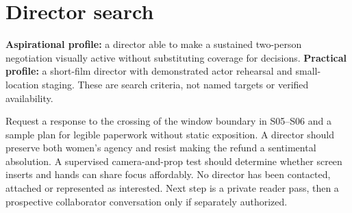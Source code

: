 \section{Director search}
\textbf{Aspirational profile:} a director able to make a sustained two-person negotiation visually active without substituting coverage for decisions. \textbf{Practical profile:} a short-film director with demonstrated actor rehearsal and small-location staging. These are search criteria, not named targets or verified availability.

Request a response to the crossing of the window boundary in S05–S06 and a sample plan for legible paperwork without static exposition. A director should preserve both women's agency and resist making the refund a sentimental absolution. A supervised camera-and-prop test should determine whether screen inserts and hands can share focus affordably. No director has been contacted, attached or represented as interested. Next step is a private reader pass, then a prospective collaborator conversation only if separately authorized.
